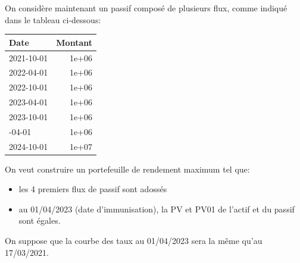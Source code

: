 \documentclass[
]{article}
\providecommand{\tightlist}{%
  \setlength{\itemsep}{0pt}\setlength{\parskip}{0pt}}
\begin{document}
On considère maintenant un passif composé de plusieurs flux, comme
indiqué dans le tableau ci-dessous:

\begin{table}[H]
\centering
\begin{tabular}{lr}
\toprule
Date & Montant\\
\midrule
2021-10-01 & 1e+06\\
2022-04-01 & 1e+06\\
2022-10-01 & 1e+06\\
2023-04-01 & 1e+06\\
2023-10-01 & 1e+06\\
\addlinespace
2024-04-01 & 1e+06\\
2024-10-01 & 1e+07\\
\bottomrule
\end{tabular}
\end{table}

On veut construire un portefeuille de rendement maximum tel que:

\begin{itemize}
\tightlist
\item
  les 4 premiers flux de passif sont adossés
\item
  au 01/04/2023 (date d'immunisation), la PV et PV01 de l'actif et du
  passif sont égales.
\end{itemize}

On suppose que la courbe des taux au 01/04/2023 sera la même qu'au
17/03/2021.
\end{document}
